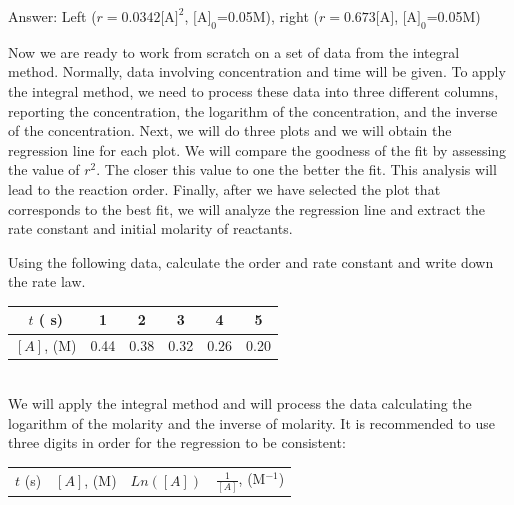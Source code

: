 \documentclass[main.tex]{subfiles}
\begin{document}
\begin{description}
\begin{example}
\begin{center}
\begin{tikzpicture}
\end{tikzpicture}
\end{center}\flushright Answer:   Left ($r=0.0342\text{[A]}^2$, $\text{[A]}_0$=0.05M), right ($r=0.673\text{[A]}$, $\text{[A]}_0$=0.05M)
\end{example}%
\item[\docfilehook{The integral method in action}{}] 
Now we are ready to work from scratch on a set of data from the integral method. Normally, data involving concentration and time will be given. To apply the integral method, we need to process these data into three different columns, reporting the concentration, the logarithm of the concentration, and the inverse of the concentration. Next, we will do three plots and we will obtain the regression line for each plot. We will compare the goodness of the fit by assessing the value of $r^2$. The closer this value to one the better the fit. This analysis will lead to the reaction order. Finally, after we have selected the plot that corresponds to the best fit, we will analyze the regression line and extract the rate constant and initial molarity of reactants. 
\begin{example} %
Using the following data, calculate the order and rate constant and write down the rate law.
\begin{center}\begin{tabular}[t]{   c|  c cccc  }
\toprule
  $t$ ( s)	&  1&2&3&4&5 \\
  \midrule
  $[A]$, (M)&0.44 &0.38&0.32 &0.26 &0.20\\
\bottomrule
\end{tabular}\end{center}
\\
We will apply the integral method and will process the data calculating the logarithm of the molarity and the inverse of molarity. It is recommended to use three digits in order for the regression to be consistent:
\begin{center}\begin{tabular}[t]{   c  c cc  }
\toprule
  $t$ (s)	&$[A]$, (M) &$Ln([A])$&$\frac{1}{[A]}$, (M$^{-1}$)\\

\end{tabular}
\end{center}
\end{example}
\end{description}
\end{document}
